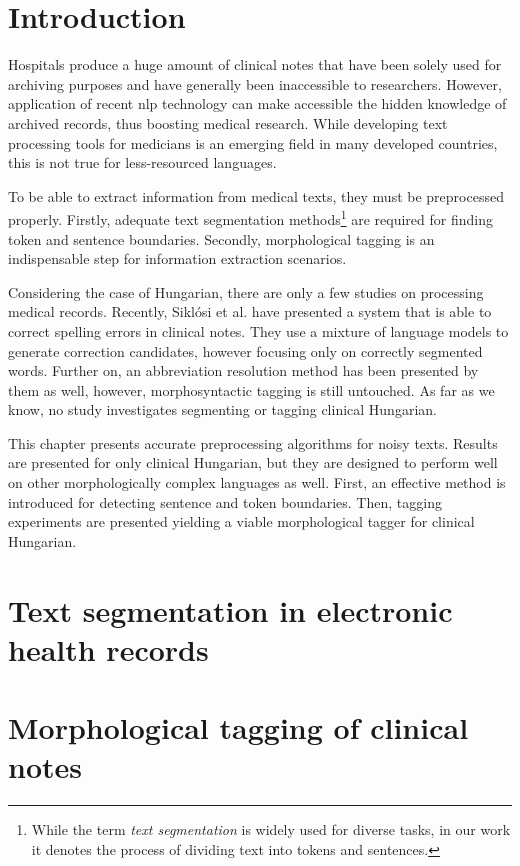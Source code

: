 
\section{Introduction}

Hospitals produce a huge amount of clinical notes that have been solely used for archiving purposes and have generally been inaccessible to researchers. 
However, application of recent \acrshort{nlp} technology can make accessible the hidden knowledge of archived records, thus boosting medical research. 
While developing text processing tools for medicians is an emerging field in many developed countries, this is not true for less-resourced languages.

To be able to extract information from medical texts, they must be preprocessed properly. 
Firstly, adequate text segmentation methods\footnote{While the term \emph{text segmentation} is widely used for diverse tasks, in our work it denotes the process of dividing text into tokens and sentences.} 
are required for finding token and sentence boundaries. 
Secondly, morphological tagging is an indispensable step for information extraction scenarios. 

Considering the case of Hungarian, there are only a few studies on processing medical records. 
Recently, Siklósi et al. \cite{Siklosi2012,Siklosi2013} have presented a system that is able to correct spelling errors in clinical notes. 
They use a mixture of language models to generate correction candidates, however focusing only on correctly segmented words. 
Further on, an abbreviation resolution method has been presented by them \cite{Siklosi2013b} as well, however, morphosyntactic tagging is still untouched. 
As far as we know, no study investigates segmenting or tagging clinical Hungarian. 

This chapter presents accurate preprocessing algorithms for noisy texts.
Results are presented for only clinical Hungarian, but they are designed to perform well on other morphologically complex languages as well. 
First, an effective method is introduced for detecting sentence and token boundaries.
Then, tagging experiments are presented yielding a viable morphological tagger for clinical Hungarian. 


\section{Text segmentation in electronic health records}\label{sec:clin_segm}


\pagebreak

\section{Morphological tagging of clinical notes}\label{sec:clin_tag}


